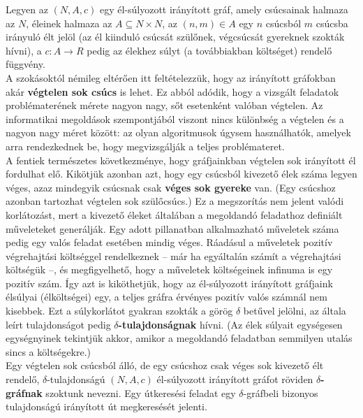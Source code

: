 \documentclass[12pt,margin=0px]{article}
\begin{document}
    {\footnotesize \noindent {\color{blue} \faLightbulbO\ $\triangleright$ } }

    {\footnotesize
    \noindent Legyen az $(N,A,c)$ egy él-súlyozott irányított gráf, amely csúcsainak halmaza az $N$, éleinek halmaza az $A\subseteq N \times N$, az $(n,m) \in A$ egy $n$ csúcsból $m$ csúcsba irányuló élt jelöl (az él kiinduló csúcsát szülőnek, végcsúcsát gyereknek szokták hívni), a $c: A \rightarrow R$ pedig az élekhez súlyt (a továbbiakban költséget) rendelő függvény.
    }\\

    {\footnotesize
    \noindent A szokásoktól némileg eltérően itt feltételezzük, hogy az irányított gráfokban akár \textbf{végtelen sok csúcs} is lehet. Ez abból adódik, hogy a vizsgált feladatok problématerének mérete nagyon nagy, sőt esetenként valóban végtelen. Az informatikai megoldások szempontjából viszont nincs különbség a végtelen és a nagyon nagy méret között: az olyan algoritmusok úgysem használhatók, amelyek arra rendezkednek be, hogy megvizsgálják a teljes problémateret.
    }\\

    {\footnotesize
    \noindent A fentiek természetes következménye, hogy gráfjainkban végtelen sok irányított él fordulhat elő. Kikötjük azonban azt, hogy egy csúcsból kivezető élek száma legyen véges, azaz mindegyik csúcsnak csak \textbf{véges sok gyereke} van. (Egy csúcshoz azonban tartozhat végtelen sok szülőcsúcs.) Ez a megszorítás nem jelent valódi korlátozást, mert a kivezető éleket általában a megoldandó feladathoz definiált műveleteket generálják. Egy adott pillanatban alkalmazható műveletek száma pedig egy valós feladat esetében mindig véges. Ráadásul a műveletek pozitív végrehajtási költséggel rendelkeznek – már ha egyáltalán számít a végrehajtási költségük –, és megfigyelhető, hogy a műveletek költségeinek infinuma is egy pozitív szám. Így azt is kiköthetjük, hogy az él-súlyozott irányított gráfjaink élsúlyai (élköltségei) egy, a teljes gráfra érvényes pozitív valós számnál nem kisebbek. Ezt a súlykorlátot gyakran szokták a görög $\delta$ betűvel jelölni, az általa leírt tulajdonságot pedig \textbf{$\delta$-tulajdonságnak} hívni. (Az élek súlyait egységesen egységnyinek tekintjük akkor, amikor a megoldandó feladatban semmilyen utalás sincs a költségekre.)
    }\\

    {\footnotesize
    \noindent Egy végtelen sok csúcsból álló, de egy csúcshoz csak véges sok kivezető élt rendelő, $\delta$-tulajdonságú $(N,A,c)$ él-súlyozott irányított gráfot röviden \textbf{$\delta$-gráfnak} szoktunk nevezni. Egy útkeresési feladat egy $\delta$-gráfbeli bizonyos tulajdonságú irányított út megkeresését jelenti.
    }\\
\end{document}
